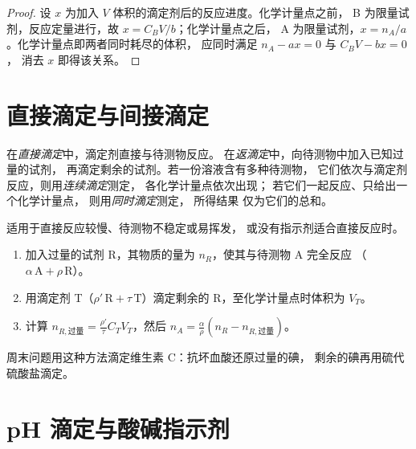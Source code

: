 \begin{proof}
设 $x$ 为加入 $V$ 体积的滴定剂后的反应进度。化学计量点之前，
B 为限量试剂，反应定量进行，故 $x = C_BV/b$；化学计量点之后，
A 为限量试剂，$x = n_A/a$。化学计量点即两者同时耗尽的体积，
应同时满足 $n_A - ax = 0$ 与 $C_BV - bx = 0$，
消去 $x$ 即得该关系。
\end{proof}

\section{直接滴定与间接滴定}

\begin{definition}[滴定的类型]\label{def:b1:titration-methods:kinds}
在\emph{直接滴定}中，滴定剂直接与待测物反应。
在\emph{返滴定}中，向待测物中加入已知过量的试剂，
再滴定剩余的试剂。若一份溶液含有多种待测物，
它们依次与滴定剂反应，则用\emph{连续滴定}测定，
各化学计量点依次出现；
若它们一起反应、只给出一个化学计量点，
则用\emph{同时滴定}测定，
所得结果
仅为它们的总和。
\end{definition}

\begin{method}[返滴定]\label{met:b1:titration-methods:back-titration}
适用于直接反应较慢、待测物不稳定或易挥发，
或没有指示剂适合直接反应时。
\begin{enumerate}
  \item 加入过量的试剂 R，其物质的量为 $n_R$，使其与待测物 A 完全反应
        （$\alpha\,\mathrm{A} + \rho\,\mathrm{R}$）。
  \item 用滴定剂 T（$\rho'\,\mathrm{R} +
        \tau\,\mathrm{T}$）滴定剩余的 R，至化学计量点时体积为 $V_T$。
  \item 计算 $n_{R,\text{过量}} = \frac{\rho'}{\tau}C_TV_T$，然后
        $n_A = \frac{\alpha}{\rho}(n_R - n_{R,\text{过量}})$。
\end{enumerate}
\end{method}

周末问题用这种方法滴定维生素 C：抗坏血酸还原过量的碘，
剩余的碘再用硫代硫酸盐滴定。

\section{pH 滴定与酸碱指示剂}

